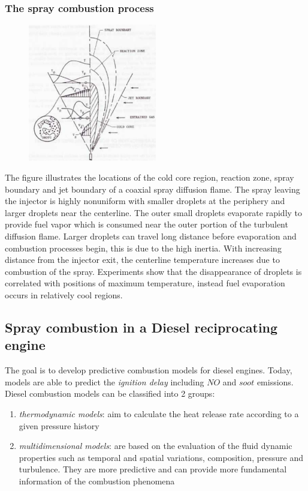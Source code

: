 \documentclass[12pt]{article}
\begin{document}
\subsubsection{The spray combustion process}

\begin{figure}[h!]
\centering
\includegraphics[width=0.5\textwidth]{figures/core.png}
\end{figure}

The figure illustrates the locations of the cold core region, reaction zone, spray boundary and jet boundary of a coaxial spray diffusion flame. The spray leaving the injector is highly nonuniform with smaller droplets at the periphery and larger droplets near the centerline. The outer small droplets evaporate rapidly to provide fuel vapor which is consumed near the outer portion of the turbulent diffusion flame. Larger droplets can travel long distance before evaporation and combustion processes begin, this is due to the high inertia. With increasing distance from the injector exit, the centerline temperature increases due to combustion of the spray. Experiments show that the disappearance of droplets is correlated with positions of maximum temperature, instead fuel evaporation occurs in relatively cool regions.

\subsection{Spray combustion in a Diesel reciprocating engine}

The goal is to develop predictive combustion models for diesel engines. Today, models are able to predict the \textit{ignition delay} including $NO$ and $soot$ emissions. Diesel combustion models can be classified into 2 groups:
\begin{enumerate}
    \item \textit{thermodynamic models}: aim to calculate the heat release rate according to a given pressure history
    \item  \textit{multidimensional models}: are based on the evaluation of the fluid dynamic properties such as temporal and spatial variations, composition, pressure and turbulence. They are more predictive and can provide more fundamental information of the combustion phenomena
\end{enumerate}
\end{document}
